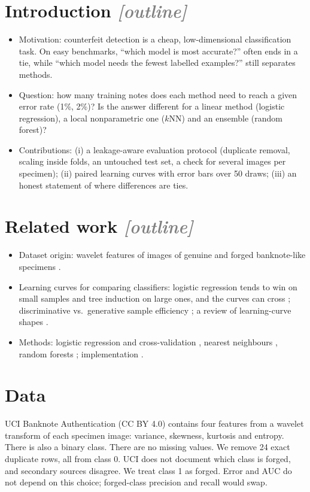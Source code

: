 \documentclass{article}
\newcommand{\todo}[1]{\textcolor{gray}{\textit{[#1]}}}
\begin{document}
\section{Introduction \todo{outline}}
\begin{itemize}
  \item Motivation: counterfeit detection is a cheap, low-dimensional classification task. On easy benchmarks, ``which model is most accurate?'' often ends in a tie, while ``which model needs the fewest labelled examples?'' still separates methods.
  \item Question: how many training notes does each method need to reach a given error rate (1\%, 2\%)? Is the answer different for a linear method (logistic regression), a local nonparametric one ($k$NN) and an ensemble (random forest)?
  \item Contributions: (i) a leakage-aware evaluation protocol (duplicate removal, scaling inside folds, an untouched test set, a check for several images per specimen); (ii) paired learning curves with error bars over 50 draws; (iii) an honest statement of where differences are ties.
\end{itemize}

\section{Related work \todo{outline}}
\begin{itemize}
  \item Dataset origin: wavelet features of images of genuine and forged banknote-like specimens \cite{lohweg2012uci,gillich2010banknote}.
  \item Learning curves for comparing classifiers: logistic regression tends to win on small samples and tree induction on large ones, and the curves can cross \cite{perlich2003tree}; discriminative vs.\ generative sample efficiency \cite{ng2002discriminative}; a review of learning-curve shapes \cite{viering2023shape}.
  \item Methods: logistic regression and cross-validation \cite{james2021isl}, nearest neighbours \cite{cover1967nearest}, random forests \cite{breiman2001random}; implementation \cite{pedregosa2011scikit}.
\end{itemize}

\section{Data}
UCI Banknote Authentication \cite{lohweg2012uci} (CC BY 4.0) contains four features from a wavelet transform of each specimen image: variance, skewness, kurtosis and entropy. There is also a binary class. There are no missing values. We remove 24 exact duplicate rows, all from class 0. UCI does not document which class is forged, and secondary sources disagree. We treat class 1 as forged. Error and AUC do not depend on this choice; forged-class precision and recall would swap.
\end{document}
